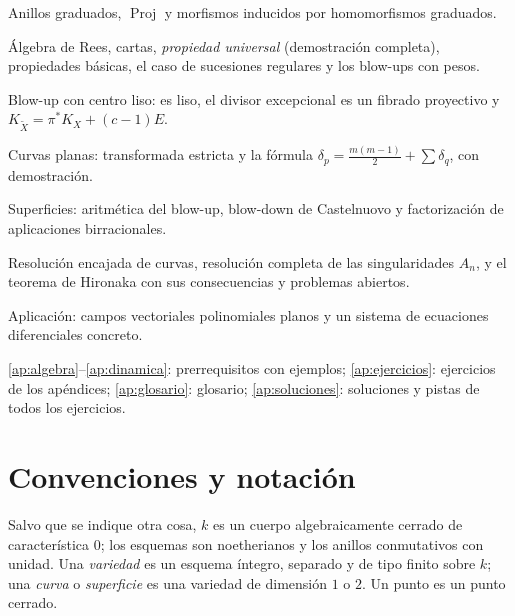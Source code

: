 \documentclass[11pt,a4paper,oneside]{book}
\newcommand{\Proj}{\operatorname{Proj}}
\theoremstyle{plain}
\theoremstyle{definition}
\theoremstyle{remark}
\newcounter{ejer}[chapter]
\begin{document}
\begin{description}[leftmargin=0.5cm,style=nextline]
\item[Capítulo~\ref{cap:prelim}] Anillos graduados, $\Proj$ y morfismos inducidos por homomorfismos graduados.
\item[Capítulo~\ref{cap:blowup}] Álgebra de Rees, cartas, \emph{propiedad universal} (demostración completa), propiedades básicas, el caso de sucesiones regulares y los blow-ups con pesos.
\item[Capítulo~\ref{cap:liso}] Blow-up con centro liso: es liso, el divisor excepcional es un fibrado proyectivo y $K_{\tilde X}=\pi^*K_X+(c-1)E$.
\item[Capítulo~\ref{cap:curvas}] Curvas planas: transformada estricta y la fórmula $\delta_p=\tfrac{m(m-1)}2+\sum\delta_q$, con demostración.
\item[Capítulo~\ref{cap:superficies}] Superficies: aritmética del blow-up, blow-down de Castelnuovo y factorización de aplicaciones birracionales.
\item[Capítulo~\ref{cap:resolucion}] Resolución encajada de curvas, resolución completa de las singularidades $A_n$, y el teorema de Hironaka con sus consecuencias y problemas abiertos.
\item[Capítulo~\ref{sec:dinamica}] Aplicación: campos vectoriales polinomiales planos y un sistema de ecuaciones diferenciales concreto.
\item[Apéndices] \ref{ap:algebra}--\ref{ap:dinamica}: prerrequisitos con ejemplos; \ref{ap:ejercicios}: ejercicios de los apéndices; \ref{ap:glosario}: glosario; \ref{ap:soluciones}: soluciones y pistas de todos los ejercicios.
\end{description}

\section{Convenciones y notación}

Salvo que se indique otra cosa, $k$ es un cuerpo algebraicamente cerrado de característica $0$; los esquemas son noetherianos y los anillos conmutativos con unidad. Una \emph{variedad} es un esquema íntegro, separado y de tipo finito sobre $k$; una \emph{curva} o \emph{superficie} es una variedad de dimensión $1$ o $2$. Un punto es un punto cerrado.
\end{document}
